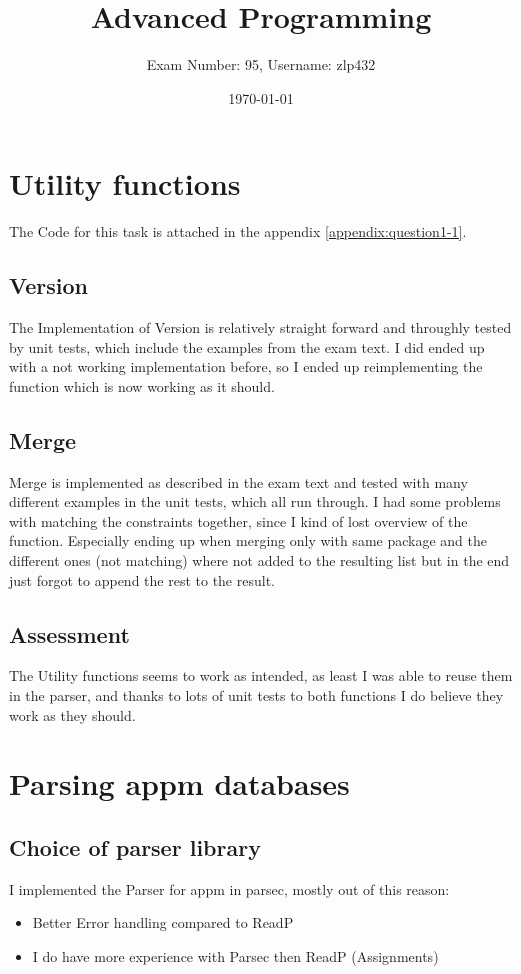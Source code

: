 \documentclass[11pt,a4paper]{article}
\newcommand{\subtitle}[1]{%
  \posttitle{%
    \par\end{center}
    \begin{center}\large#1\end{center}
    \vskip0.5em}%
}
\begin{document}
\title{Advanced Programming}
\subtitle{Exam 2018}

\author{Exam Number: 95, Username: zlp432}
\date{\today}
	
\maketitle
\tableofcontents

\section{Utility functions}
The Code for this task is attached in the appendix \ref{appendix:question1-1}.

\subsection{Version}
The Implementation of Version is relatively straight forward and throughly tested by unit tests, which include the examples from the exam text.
I did ended up with a not working implementation before, so I ended up reimplementing the function which is now working as it should.

\subsection{Merge}
Merge is implemented as described in the exam text and tested with many different examples in the unit tests, which all run through.
I had some problems with matching the constraints together, since I kind of lost overview of the function.
Especially ending up when merging only with same package and the different ones (not matching) where not added to the resulting list but in the end just forgot to append the rest to the result.

\subsection{Assessment}
The Utility functions seems to work as intended, as least I was able to reuse them in the parser, and thanks to lots of unit tests to both functions I do believe they work as they should.

\section{Parsing appm databases}
\subsection{Choice of parser library}
I implemented the Parser for appm in parsec, mostly out of this reason:
\begin{itemize}
	\item Better Error handling compared to ReadP
	\item I do have more experience with Parsec then ReadP (Assignments)
\end{itemize}
\end{document}
